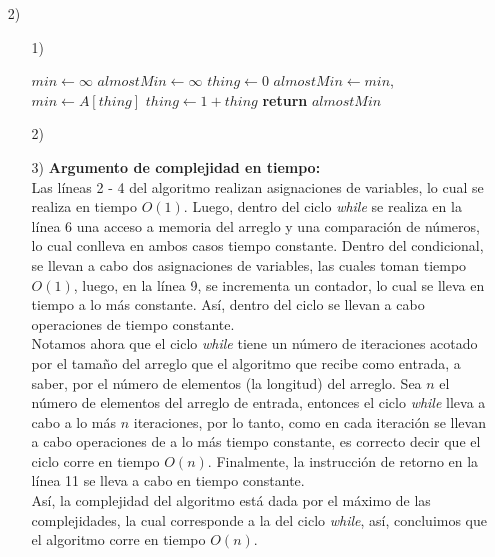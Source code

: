 \documentclass[a4paper, 12pt]{report}
\begin{document}
\begin{enumerate}
\newpage
\item[2)]{
\begin{enumerate}
    \item[1)]{
        \begin{algorithmic}[1]
            \State $min\gets \infty$
            \State $almostMin\gets \infty$
            \State $thing\gets 0$
                    \State $almostMin\gets min$, $min\gets A[thing]$
                \EndIf
                \State $thing\gets 1 + thing$
            \EndWhile\label{euclidendwhile}
            \State \textbf{return} $almostMin$
            \EndProcedure
        \end{algorithmic}
    }
    \item[2)]{}
    \item[3)]{\bf Argumento de complejidad en tiempo:\\}
        Las líneas 2 - 4 del algoritmo realizan asignaciones de variables, lo
        cual se realiza en tiempo $O(1)$. Luego, dentro del ciclo {\it while}
        se realiza en la línea 6 una acceso a memoria del arreglo y una
        comparación de números, lo cual conlleva en ambos casos tiempo
        constante. Dentro del condicional, se llevan a cabo dos asignaciones
        de variables, las cuales toman tiempo $O(1)$, luego, en la línea
        9, se incrementa un contador, lo cual se lleva en tiempo a lo más
        constante. Así, dentro del ciclo se llevan a cabo operaciones
        de tiempo constante.\\
        Notamos ahora que el ciclo {\it while} tiene un número de iteraciones
        acotado por el tamaño del arreglo que el algoritmo que recibe como
        entrada, a saber, por el número de elementos (la longitud) del arreglo.
        Sea $n$ el número de elementos del arreglo de entrada, entonces el ciclo
        {\it while} lleva a cabo a lo más $n$ iteraciones, por lo tanto,
        como en cada iteración se llevan a cabo operaciones de a lo más tiempo
        constante, es correcto decir que el ciclo corre en tiempo $O(n)$.
        Finalmente, la instrucción de retorno en la línea 11 se lleva a cabo en
        tiempo constante.\\
        Así, la complejidad del algoritmo está dada por el máximo de las
        complejidades, la cual corresponde a la del ciclo {\it while}, así,
        concluimos que el algoritmo corre en tiempo $O(n)$.


\end{enumerate}
}
\end{enumerate}
\end{document}
